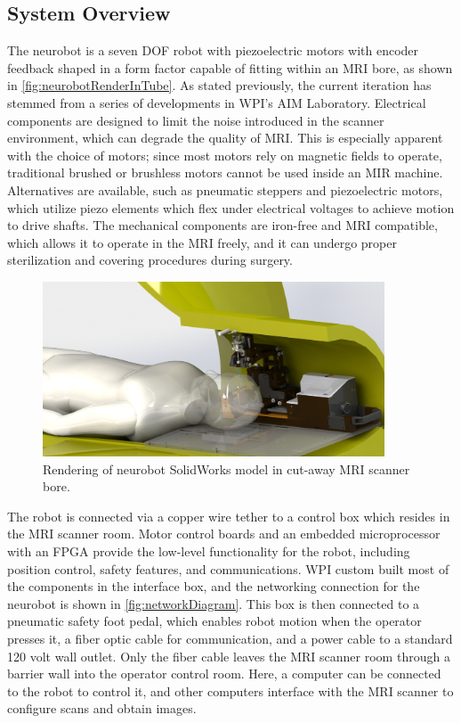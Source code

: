 \documentclass[12pt]{report}
\begin{document}
\subsection{System Overview}
The neurobot is a seven DOF robot with piezoelectric motors with encoder feedback shaped in a form factor capable of fitting within an MRI bore, as shown in \autoref{fig:neurobotRenderInTube}. As stated previously, the current iteration has stemmed from a series of developments in WPI's AIM Laboratory. \cite{aimLabRobot} Electrical components are designed to limit the noise introduced in the scanner environment, which can degrade the quality of MRI. This is especially apparent with the choice of motors; since most motors rely on magnetic fields to operate, traditional brushed or brushless motors cannot be used inside an MIR machine. Alternatives are available, such as pneumatic steppers and piezoelectric motors, which utilize piezo elements which flex under electrical voltages to achieve motion to drive shafts. \cite{piezoLegs} The mechanical components are iron-free and MRI compatible, which allows it to operate in the MRI freely, and it can undergo proper sterilization and covering procedures during surgery.

\begin{figure}[thpb]
	\centering
	\includegraphics[width=4in]{images/neurobot_rendering_with_patient_in_bore.png}
    \caption{Rendering of neurobot SolidWorks model in cut-away MRI scanner bore.}
    \label{fig:neurobotRenderInTube}
\end{figure}

The robot is connected via a copper wire tether to a control box which resides in the MRI scanner room. Motor control boards and an embedded microprocessor with an FPGA provide the low-level functionality for the robot, including position control, safety features, and communications. WPI custom built most of the components in the interface box, and the networking connection for the neurobot is shown in \autoref{fig:networkDiagram}. This box is then connected to a pneumatic safety foot pedal, which enables robot motion when the operator presses it, a fiber optic cable for communication, and a power cable to a standard 120 volt wall outlet. Only the fiber cable leaves the MRI scanner room through a barrier wall into the operator control room. Here, a computer can be connected to the robot to control it, and other computers interface with the MRI scanner to configure scans and obtain images. 
\end{document}

